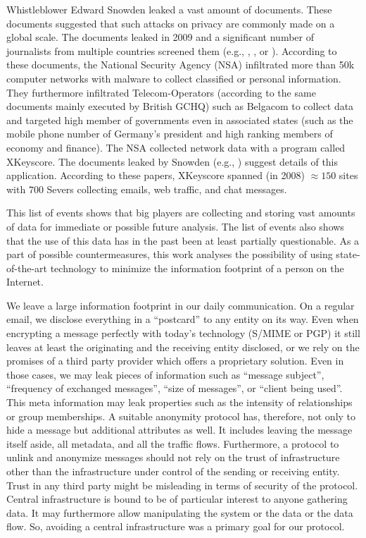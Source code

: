 \documentclass[10pt,journal,compsoc,twocolumn,twoside]{IEEEtran}
\begin{document}
Whistleblower Edward Snowden leaked a vast amount of documents. These documents suggested that such attacks on privacy are commonly made on a global scale. The documents leaked in 2009 and a significant number of journalists from multiple countries screened them (e.g., \cite{NCR2013}, \cite{XKeyscore}, \cite{Ball2013} or \cite{Greenberg2013}). According to these documents, the National Security Agency (NSA) infiltrated more than 50k computer networks with malware to collect classified or personal information. They furthermore infiltrated Telecom-Operators (according to the same documents mainly executed by British GCHQ) such as Belgacom to collect data and targeted high member of governments even in associated states (such as the mobile phone number of Germany's president and high ranking members of economy and finance). The NSA collected network data with a program called XKeyscore. The documents leaked by Snowden (e.g., \cite{XKeyscore}) suggest details of this application. According to these papers, XKeyscore spanned (in 2008) $\approx150$ sites with $700$ Severs collecting emails, web traffic, and chat messages.

This list of events shows that big players are collecting and storing vast amounts of data for immediate or possible future analysis. The list of events also shows that the use of this data has in the past been at least partially questionable. As a part of possible countermeasures, this work analyses the possibility of using state-of-the-art technology to minimize the information footprint of a person on the Internet. 

We leave a large information footprint in our daily communication. On a regular email, we disclose everything in a ``postcard'' to any entity on its way. Even when encrypting a message perfectly with today's technology (S/MIME\cite{RFC2045} or PGP\cite{RFC2015}) it still leaves at least the originating and the receiving entity disclosed, or we rely on the promises of a third party provider which offers a proprietary solution. Even in those cases, we may leak pieces of information such as ``message subject'', ``frequency of exchanged messages'', ``size of messages'', or ``client being used''. This meta information may leak properties such as the intensity of relationships or group memberships. A suitable anonymity protocol has, therefore, not only to hide a message but additional attributes as well. It includes leaving the message itself aside, all metadata, and all the traffic flows. Furthermore, a protocol to unlink and anonymize messages should not rely on the trust of infrastructure other than the infrastructure under control of the sending or receiving entity. Trust in any third party might be misleading in terms of security of the protocol. Central infrastructure is bound to be of particular interest to anyone gathering data. It may furthermore allow manipulating the system or the data or the data flow. So, avoiding a central infrastructure was a primary goal for our protocol.
\end{document}
